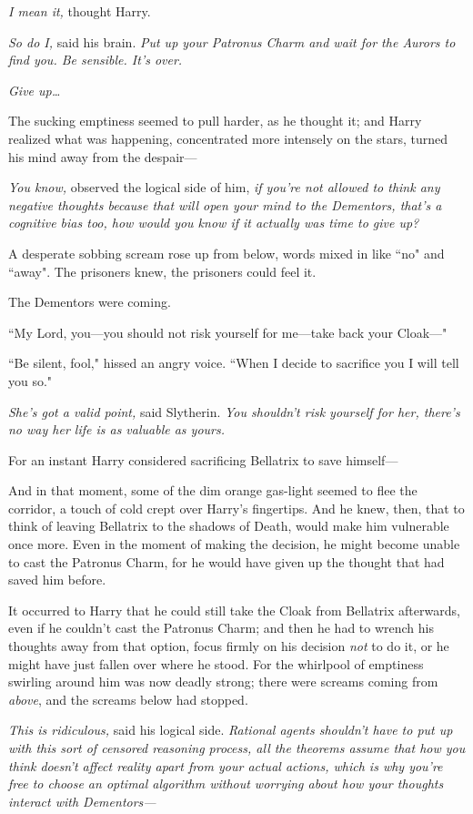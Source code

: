 \emph{I mean it,} thought Harry.

\emph{So do I,} said his brain. \emph{Put up your Patronus Charm and wait for the Aurors to find you. Be sensible. It's over.}

\emph{Give up{\ldots}}

The sucking emptiness seemed to pull harder, as he thought it; and Harry realized what was happening, concentrated more intensely on the stars, turned his mind away from the despair—

\emph{You know,} observed the logical side of him, \emph{if you're not allowed to think \emph{any} negative thoughts because that will open your mind to the Dementors, \emph{that's} a cognitive bias too, how would you know if it actually \emph{was} time to give up?}

A desperate sobbing scream rose up from below, words mixed in like ``no" and ``away". The prisoners knew, the prisoners could feel it.

The Dementors were coming.

``My Lord, you—you should not risk yourself for me—take back your Cloak—"

``Be silent, fool," hissed an angry voice. ``When I decide to sacrifice you I will tell you so."

\emph{She's got a valid point,} said Slytherin. \emph{You \emph{shouldn't} risk yourself for her, there's no way her life is as valuable as yours.}

For an instant Harry considered sacrificing Bellatrix to save himself—

And in that moment, some of the dim orange gas-light seemed to flee the corridor, a touch of cold crept over Harry's fingertips. And he knew, then, that to think of leaving Bellatrix to the shadows of Death, would make him vulnerable once more. Even in the moment of making the decision, he might become unable to cast the Patronus Charm, for he would have given up the thought that had saved him before.

It occurred to Harry that he could still take the Cloak from Bellatrix afterwards, even if he couldn't cast the Patronus Charm; and then he had to wrench his thoughts away from that option, focus firmly on his decision \emph{not} to do it, or he might have just fallen over where he stood. For the whirlpool of emptiness swirling around him was now deadly strong; there were screams coming from \emph{above}, and the screams below had stopped.

\emph{This is ridiculous,} said his logical side. \emph{Rational agents shouldn't have to put up with this sort of censored reasoning process, all the theorems assume that how you think doesn't affect reality apart from your actual actions, which is why you're free to choose an optimal algorithm without worrying about how your thoughts interact with Dementors—}


